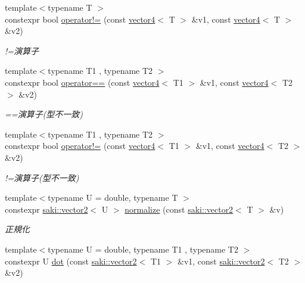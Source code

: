 \begin{DoxyCompactItemize}
{\footnotesize template$<$typename T $>$ }\\constexpr bool \mbox{\hyperlink{namespacesaki_a6805502ef12cd12f6be61a958fd35aa7}{operator!=}} (const \mbox{\hyperlink{classsaki_1_1vector4}{vector4}}$<$ T $>$ \&v1, const \mbox{\hyperlink{classsaki_1_1vector4}{vector4}}$<$ T $>$ \&v2)
\begin{DoxyCompactList}\small\item\em !=演算子 \end{DoxyCompactList}\item 
{\footnotesize template$<$typename T1 , typename T2 $>$ }\\constexpr bool \mbox{\hyperlink{namespacesaki_af2a10e5e2974f482b6da75d9137dc143}{operator==}} (const \mbox{\hyperlink{classsaki_1_1vector4}{vector4}}$<$ T1 $>$ \&v1, const \mbox{\hyperlink{classsaki_1_1vector4}{vector4}}$<$ T2 $>$ \&v2)
\begin{DoxyCompactList}\small\item\em ==演算子(型不一致) \end{DoxyCompactList}\item 
{\footnotesize template$<$typename T1 , typename T2 $>$ }\\constexpr bool \mbox{\hyperlink{namespacesaki_abf6f98117a7a12898df59d2041040000}{operator!=}} (const \mbox{\hyperlink{classsaki_1_1vector4}{vector4}}$<$ T1 $>$ \&v1, const \mbox{\hyperlink{classsaki_1_1vector4}{vector4}}$<$ T2 $>$ \&v2)
\begin{DoxyCompactList}\small\item\em !=演算子(型不一致) \end{DoxyCompactList}\item 
{\footnotesize template$<$typename U  = double, typename T $>$ }\\constexpr \mbox{\hyperlink{classsaki_1_1vector2}{saki\+::vector2}}$<$ U $>$ \mbox{\hyperlink{namespacesaki_a0ca208fb45c585d9cd23276fb91e40ee}{normalize}} (const \mbox{\hyperlink{classsaki_1_1vector2}{saki\+::vector2}}$<$ T $>$ \&v)
\begin{DoxyCompactList}\small\item\em 正規化 \end{DoxyCompactList}\item 
{\footnotesize template$<$typename U  = double, typename T1 , typename T2 $>$ }\\constexpr U \mbox{\hyperlink{namespacesaki_a820a45ae402c8447bce4fee36a1f7d62}{dot}} (const \mbox{\hyperlink{classsaki_1_1vector2}{saki\+::vector2}}$<$ T1 $>$ \&v1, const \mbox{\hyperlink{classsaki_1_1vector2}{saki\+::vector2}}$<$ T2 $>$ \&v2)

\end{DoxyCompactItemize}
